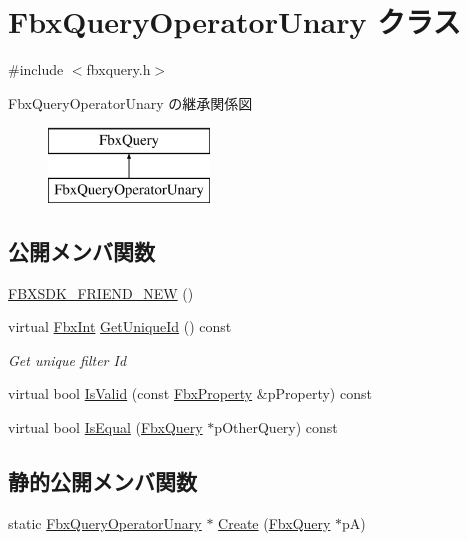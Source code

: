 \hypertarget{class_fbx_query_operator_unary}{}\section{Fbx\+Query\+Operator\+Unary クラス}
\label{class_fbx_query_operator_unary}


{\ttfamily \#include $<$fbxquery.\+h$>$}

Fbx\+Query\+Operator\+Unary の継承関係図\begin{figure}[H]
\begin{center}
\leavevmode
\includegraphics[height=2.000000cm]{class_fbx_query_operator_unary}
\end{center}
\end{figure}
\subsection*{公開メンバ関数}
\begin{DoxyCompactItemize}
\item 
\hyperlink{class_fbx_query_operator_unary_a960083d88f202ec081974d82f2720fe2}{F\+B\+X\+S\+D\+K\+\_\+\+F\+R\+I\+E\+N\+D\+\_\+\+N\+EW} ()
\item 
virtual \hyperlink{fbxtypes_8h_a088fa96de3b0b3ea69f0f6afef525dfb}{Fbx\+Int} \hyperlink{class_fbx_query_operator_unary_ac2e7dbfc697aee51db49db2857ab2b7c}{Get\+Unique\+Id} () const
\begin{DoxyCompactList}\small\item\em Get unique filter Id \end{DoxyCompactList}\item 
virtual bool \hyperlink{class_fbx_query_operator_unary_a4987590ec1680775240b813ec3b2ffb4}{Is\+Valid} (const \hyperlink{class_fbx_property}{Fbx\+Property} \&p\+Property) const
\item 
virtual bool \hyperlink{class_fbx_query_operator_unary_a36c2fea0f42bd732d559375d64b0134e}{Is\+Equal} (\hyperlink{class_fbx_query}{Fbx\+Query} $\ast$p\+Other\+Query) const
\end{DoxyCompactItemize}
\subsection*{静的公開メンバ関数}
\begin{DoxyCompactItemize}
\item 
static \hyperlink{class_fbx_query_operator_unary}{Fbx\+Query\+Operator\+Unary} $\ast$ \hyperlink{class_fbx_query_operator_unary_a7ad77bd7ddd3818204a19513c7b09c2c}{Create} (\hyperlink{class_fbx_query}{Fbx\+Query} $\ast$pA)
\end{DoxyCompactItemize}
